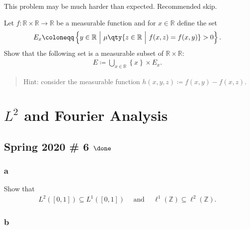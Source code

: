 \begin{warnings}

This problem may be much harder than expected. Recommended skip.

\end{warnings}

Let \(f: {\mathbb{R}}\times{\mathbb{R}}\to {\mathbb{R}}\) be a
measurable function and for \(x\in {\mathbb{R}}\) define the set
\begin{align*}
E_x \coloneqq\left\{{ y\in {\mathbb{R}}{~\mathrel{\Big|}~}\mu\qty{ z\in {\mathbb{R}}{~\mathrel{\Big|}~}f(x,z) = f(x, y) } > 0 }\right\} 
.\end{align*}
Show that the following set is a measurable subset of
\({\mathbb{R}}\times{\mathbb{R}}\):
\begin{align*}
E \coloneqq\displaystyle\bigcup_{x\in {\mathbb{R}}} \left\{{ x }\right\} \times E_x
.\end{align*}

\begin{quote}
Hint: consider the measurable function
\(h(x,y,z) \coloneqq f(x, y) - f(x, z)\).
\end{quote}

\hypertarget{l2-and-fourier-analysis}{%
\section{\texorpdfstring{\(L^2\) and Fourier
Analysis}{L\^{}2 and Fourier Analysis}}\label{l2-and-fourier-analysis}}

\hypertarget{spring-2020-6-done}{%
\subsection{\texorpdfstring{Spring 2020 \# 6
\(\done\)}{Spring 2020 \# 6 \textbackslash done}}\label{spring-2020-6-done}}

\hypertarget{a-1}{%
\subsubsection{a}\label{a-1}}

Show that
\begin{align*}
L^2([0, 1]) \subseteq L^1([0, 1]) {\quad \operatorname{and} \quad} \ell^1({\mathbb{Z}}) \subseteq \ell^2({\mathbb{Z}})
.\end{align*}

\hypertarget{b-1}{%
\subsubsection{b}\label{b-1}}

